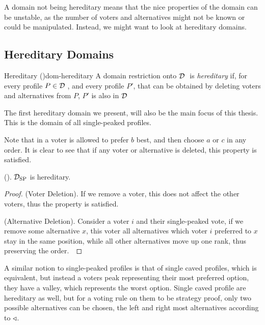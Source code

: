 A domain not being hereditary means that the nice properties of the domain can be unstable, as the number of voters and alternatives might not be known or could be manipulated. Instead, we might want to look at hereditary domains.

\subsection{Hereditary Domains}

\begin{definition}{Hereditary \textnormal{(\citet{elkindPreferenceRestrictionsComputational2022a})}}{dom-hereditary}
	A domain restriction onto $\mathcal{D}_{\textnormal{ }}$ is \textit{hereditary} if, for every profile $P \in \mathcal{D}_{\textnormal{ }}$, and every profile $P'$, that can be obtained by deleting voters and alternatives from $P$, $P'$ is also in $\mathcal{D}_{\textnormal{ }}$
\end{definition}


The first hereditary domain we present, will also be the main focus of this thesis. This is the domain of all single-peaked profiles.


Note that in  a voter is allowed to prefer $b$ best, and then choose $a$ or $c$ in any order. It is clear to see that if any voter or alternative is deleted, this property is satisfied.

\begin{proposition}{\textnormal{(\citet{elkindPreferenceRestrictionsComputational2022a}).}}
	$\mathcal{D}_{\textnormal{SP}}$ is hereditary.
\end{proposition}

\begin{proof}
	(Voter Deletion). If we remove a voter, this does not affect the other voters, thus the property is satisfied.~\checkmark

	(Alternative Deletion). Consider a voter $i$ and their single-peaked vote, if we remove some alternative $x$, this voter all alternatives which voter $i$ preferred to $x$ stay in the same position, while all other alternatives move up one rank, thus preserving the order.~\checkmark
\end{proof}

A similar notion to single-peaked profiles is that of single caved profiles, which is equivalent, but instead a voters peak representing their most preferred option, they have a valley, which represents the worst option. Single caved profile are hereditary as well, but for a voting rule on them to be strategy proof, only two possible alternatives can be chosen, the left and right most alternatives according to $\triangleleft$.

